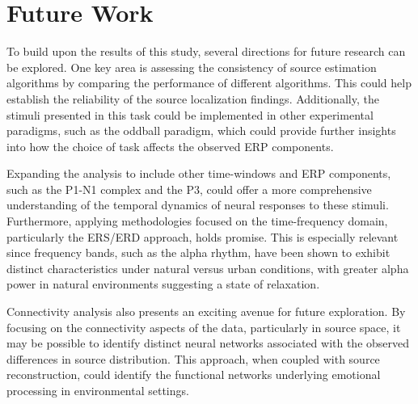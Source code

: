 \section{Future Work}
\label{section:future_work}

To build upon the results of this study, several directions for future research can be explored. One key area is assessing the consistency of source estimation algorithms by comparing the performance of different algorithms. This could help establish the reliability of the source localization findings. Additionally, the stimuli presented in this task could be implemented in other experimental paradigms, such as the oddball paradigm,  which could provide further insights into how the choice of task affects the observed ERP components.

Expanding the analysis to include other time-windows and ERP components, such as the P1-N1 complex and the P3, could offer a more comprehensive understanding of the temporal dynamics of neural responses to these stimuli. Furthermore, applying methodologies focused on the time-frequency domain, particularly the ERS/ERD approach, holds promise. This is especially relevant since frequency bands, such as the alpha rhythm, have been shown to exhibit distinct characteristics under natural versus urban conditions, with greater alpha power in natural environments suggesting a state of relaxation.

Connectivity analysis also presents an exciting avenue for future exploration. By focusing on the connectivity aspects of the data, particularly in source space, it may be possible to identify distinct neural networks associated with the observed differences in source distribution. This approach, when coupled with source reconstruction, could identify the functional networks underlying emotional processing in environmental settings.

